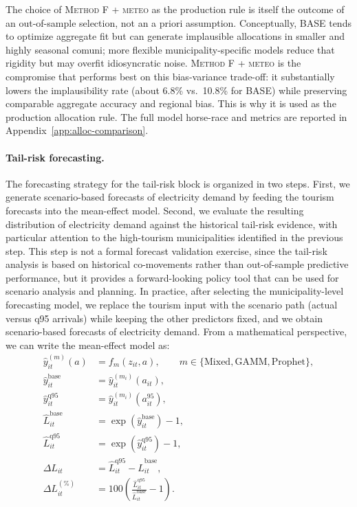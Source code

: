 \documentclass[11pt,a4paper]{article}
\begin{document}
\medskip
\noindent The choice of \textsc{Method F + meteo} as the production rule is itself the outcome of an out-of-sample selection, not an a priori assumption. Conceptually, BASE tends to optimize aggregate fit but can generate implausible allocations in smaller and highly seasonal comuni; more flexible municipality-specific models reduce that rigidity but may overfit idiosyncratic noise. \textsc{Method F + meteo} is the compromise that performs best on this bias-variance trade-off: it substantially lowers the implausibility rate (about 6.8\% vs.\ 10.8\% for BASE) while preserving comparable aggregate accuracy and regional bias. This is why it is used as the production allocation rule. The full model horse-race and metrics are reported in Appendix~\ref{app:alloc-comparison}.

\paragraph{Tail-risk forecasting.}
The forecasting strategy for the tail-risk block is organized in two steps. 
First, we generate scenario-based forecasts of electricity demand by feeding the tourism forecasts 
into the mean-effect model. Second, we evaluate the resulting distribution of electricity demand 
against the historical tail-risk evidence, with particular attention to the high-tourism municipalities
identified in the previous step. This step is not a formal forecast validation exercise, 
since the tail-risk analysis is based on historical co-movements rather than out-of-sample predictive performance, but 
it provides a forward-looking policy tool that can be used for scenario analysis and planning.
In practice, after selecting the municipality-level forecasting model, we replace the tourism input with the scenario path (actual versus q95 arrivals) while keeping the other predictors fixed, and we obtain scenario-based forecasts of electricity demand.
From a mathematical perspective, we can write the mean-effect model as:
\begin{equation}
\label{eq:mean-effect-forecast}
\begin{aligned}
\hat y_{it}^{(m)}(a) &= f_m\!\left(z_{it},a\right), \qquad m\in\{\text{Mixed},\text{GAMM},\text{Prophet}\},\\
\hat y_{it}^{\text{base}} &= \hat y_{it}^{(m_i)}\!\left(a_{it}\right),\\
\hat y_{it}^{\text{q95}}  &= \hat y_{it}^{(m_i)}\!\left(a_{it}^{95}\right),\\
\hat L_{it}^{\text{base}} &= \exp\!\left(\hat y_{it}^{\text{base}}\right)-1,\\
\hat L_{it}^{\text{q95}}  &= \exp\!\left(\hat y_{it}^{\text{q95}}\right)-1,\\
\Delta L_{it} &= \hat L_{it}^{\text{q95}}-\hat L_{it}^{\text{base}},\\
\Delta L_{it}^{(\%)} &= 100\left(\frac{\hat L_{it}^{\text{q95}}}{\hat L_{it}^{\text{base}}}-1\right).
\end{aligned}
\end{equation}
\end{document}
